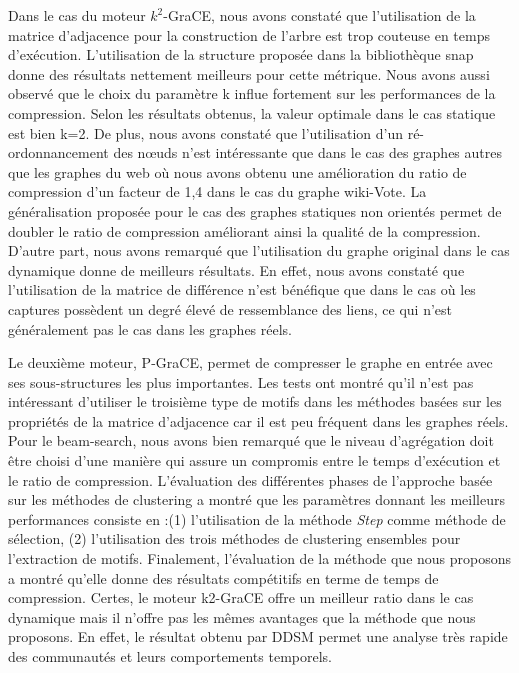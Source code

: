 	Dans le cas du moteur $k^2$-GraCE, nous avons constaté que l'utilisation de la matrice d'adjacence pour la construction de l'arbre est trop couteuse en temps d'exécution. L'utilisation de la structure proposée dans la bibliothèque \gls{snap} donne des résultats nettement meilleurs pour cette métrique. Nous avons aussi observé que le choix du paramètre k influe fortement sur les performances de la compression. Selon les résultats obtenus, la valeur optimale dans le cas statique est bien k=2. De plus, nous avons constaté que l'utilisation d'un ré-ordonnancement des nœuds n'est intéressante que dans le cas des graphes autres que les graphes du web où nous avons obtenu une amélioration du ratio de compression d'un facteur de 1,4 dans le cas du graphe wiki-Vote. La généralisation  proposée pour le cas des graphes statiques non orientés permet de doubler le ratio de compression améliorant ainsi la qualité de la compression. D'autre part, nous avons remarqué que l'utilisation du graphe original dans le cas dynamique donne de meilleurs résultats. En effet, nous avons constaté que l'utilisation de la matrice de différence n'est bénéfique que dans le cas où les captures possèdent un degré élevé de ressemblance des liens, ce qui n'est généralement pas le cas dans les graphes réels.
	
	Le deuxième moteur, P-GraCE, permet de compresser le graphe en entrée avec ses sous-structures les plus importantes. Les tests ont montré qu'il n'est pas intéressant d'utiliser le troisième type de motifs dans les méthodes basées sur les propriétés de la matrice d'adjacence car il est peu fréquent dans les graphes réels. Pour le beam-search, nous avons bien remarqué que le niveau d'agrégation doit être choisi d'une manière qui assure un compromis entre le temps d'exécution et le ratio de compression. L'évaluation des différentes phases de  l'approche basée sur les méthodes de clustering a montré que les paramètres donnant les meilleurs performances consiste en :(1) l'utilisation de la méthode \textit{Step} comme méthode de sélection, (2) l'utilisation des trois méthodes de clustering ensembles pour l'extraction de motifs. Finalement, l'évaluation de la méthode que nous proposons a montré qu'elle donne des résultats compétitifs en terme de temps de compression. Certes, le moteur k2-GraCE offre un meilleur ratio dans le cas dynamique mais il n'offre pas les mêmes avantages que la méthode que nous proposons. En effet, le résultat obtenu par DDSM permet une analyse très rapide des communautés et leurs comportements temporels.
	
